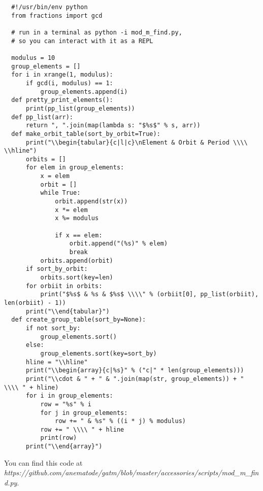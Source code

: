 \documentclass[../gatm_answers.tex]{subfiles}
\begin{document}
\begin{verbatim}
  #!/usr/bin/env python
  from fractions import gcd

  # run in a terminal as python -i mod_m_find.py,
  # so you can interact with it as a REPL

  modulus = 10
  group_elements = []
  for i in xrange(1, modulus):
      if gcd(i, modulus) == 1:
          group_elements.append(i)
  def pretty_print_elements():
      print(pp_list(group_elements))
  def pp_list(arr):
      return ", ".join(map(lambda s: "$%s$" % s, arr))
  def make_orbit_table(sort_by_orbit=True):
      print("\\begin{tabular}{c|l|c}\nElement & Orbit & Period \\\\ \\hline")
      orbits = []
      for elem in group_elements:
          x = elem
          orbit = []
          while True:
              orbit.append(str(x))
              x *= elem
              x %= modulus

              if x == elem:
                  orbit.append("(%s)" % elem)
                  break
          orbits.append(orbit)
      if sort_by_orbit:
          orbits.sort(key=len)
      for orbiit in orbits:
          print("$%s$ & %s & $%s$ \\\\" % (orbiit[0], pp_list(orbiit), len(orbiit) - 1))
      print("\\end{tabular}")
  def create_group_table(sort_by=None):
      if not sort_by:
          group_elements.sort()
      else:
          group_elements.sort(key=sort_by)
      hline = "\\hline"
      print("\\begin{array}{c|%s}" % ("c|" * len(group_elements)))
      print("\\cdot & " + " & ".join(map(str, group_elements)) + " \\\\ " + hline)
      for i in group_elements:
          row = "%s" % i
          for j in group_elements:
              row += " & %s" % ((i * j) % modulus)
          row += " \\\\ " + hline
          print(row)
      print("\\end{array}")
\end{verbatim}

You can find this code at \textit{https://github.com/anematode/gatm/blob/master/accessories/scripts/mod\_m\_find.py}.
\end{document}
